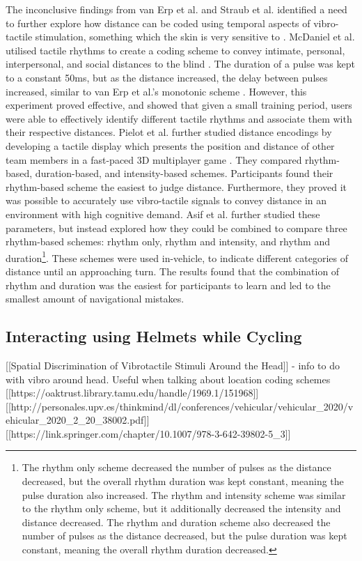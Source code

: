 \documentclass{interim}
\begin{document}
The inconclusive findings from van Erp et al. \cite{10.1145/1060581.1060585} and Straub et al. \cite{5326374} identified a need to further explore how distance can be coded using temporal aspects of vibro-tactile stimulation, something which the skin is very sensitive to \cite{doi:10.1068/p5014}. McDaniel et al. utilised tactile rhythms to create a coding scheme to convey intimate, personal, interpersonal, and social distances to the blind \cite{10.1145/1520340.1520718}. The duration of a pulse was kept to a constant 50ms, but as the distance increased, the delay between pulses increased, similar to van Erp et al.'s monotonic scheme \cite{10.1145/1060581.1060585}. However, this experiment proved effective, and showed that given a small training period, users were able to effectively identify different tactile rhythms and associate them with their respective distances. Pielot et al. further studied distance encodings by developing a tactile display which presents the position and distance of other team members in a fast-paced 3D multiplayer game \cite{10.1145/1753326.1753581}. They compared rhythm-based, duration-based, and intensity-based schemes. Participants found their rhythm-based scheme the easiest to judge distance. Furthermore, they proved it was possible to accurately use vibro-tactile signals to convey distance in an environment with high cognitive demand. Asif et al. \cite{10.1145/1868914.1868923} further studied these parameters, but instead explored how they could be combined to compare three rhythm-based schemes: rhythm only, rhythm and intensity, and rhythm and duration\footnote{The rhythm only scheme decreased the number of pulses as the distance decreased, but the overall rhythm duration was kept constant, meaning the pulse duration also increased. The rhythm and intensity scheme was similar to the rhythm only scheme, but it additionally decreased the intensity and distance decreased. The rhythm and duration scheme also decreased the number of pulses as the distance decreased, but the pulse duration was kept constant, meaning the overall rhythm duration decreased.}. These schemes were used in-vehicle, to indicate different categories of distance until an approaching turn. The results found that the combination of rhythm and duration was the easiest for participants to learn and led to the smallest amount of navigational mistakes.


\subsection{Interacting using Helmets while Cycling}
[[Spatial Discrimination of Vibrotactile Stimuli Around the Head]] - info to do with vibro around head. Useful when talking about location coding schemes
\cite{10.1145/2559206.2574803, 10.1145/1240866.1241027}
[[https://oaktrust.library.tamu.edu/handle/1969.1/151968]]
[[http://personales.upv.es/thinkmind/dl/conferences/vehicular/vehicular_2020/vehicular_2020_2_20_38002.pdf]]
[[https://link.springer.com/chapter/10.1007/978-3-642-39802-5_3]]
\end{document}
